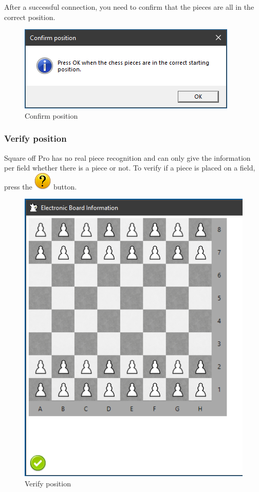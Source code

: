 \documentclass[11pt,a4paper]{article}
\begin{document}
After a successful connection, you need to confirm that the pieces are all in the correct position.

\begin{figure}[H]
	\centering
	\includegraphics[scale=0.8]{Pegasus4.png}
	\caption{Confirm position}
	\label{fig:SquareOffPro4}
\end{figure}

\subsubsection{Verify position} \label{VerifyPegasusPosition}
Square off Pro has no real piece recognition and can only give the information per field whether there is a piece or not. To verify if a piece is placed on a field, press the  \includegraphics[scale=0.4]{emotion_question.png} button.

\begin{figure}[H]
	\centering
	\includegraphics[scale=0.8]{Pegasus5.png}
	\caption{Verify position}
	\label{fig:SquareOffPro5}
\end{figure}
\end{document}
